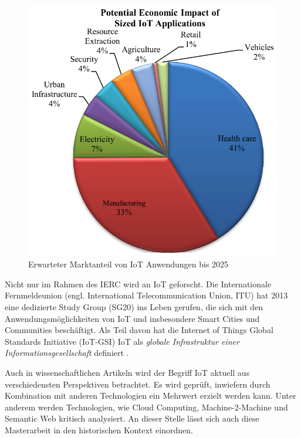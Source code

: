 \begin{figure}[t]
	\centering
	\includegraphics[width=\textwidth]{bilder/iot_market_share}
	\caption{Erwarteter Marktanteil von IoT Anwendungen bis 2025 \cite{IotEnablers}}
	\label{fig:market}
\end{figure}



Nicht nur im Rahmen des IERC wird an IoT geforscht. Die Internationale Fernmeldeunion (engl. International Telecommunication Union, ITU) hat 2013 eine dedizierte Study Group (SG20) ins Leben gerufen, die sich mit den Anwendungsmöglichkeiten von IoT und insbesondere Smart Cities und Communities beschäftigt. Als Teil davon hat die Internet of Things Global Standards Initiative (IoT-GSI) IoT als \textit{globale Infrastruktur einer Informationsgesellschaft} definiert \cite{iot:glob_infr}.  

Auch in wissenschaftlichen Artikeln wird der Begriff IoT aktuell aus verschiedensten Perspektiven betrachtet. Es wird geprüft, inwiefern durch Kombination mit anderen Technologien ein Mehrwert erzielt werden kann. Unter anderem werden Technologien, wie Cloud Computing\cite{FiCloud:CloudIot}, Machine-2-Machine\cite{FiCloud:M3Iot} und Semantic Web\cite{SemWebIoT} kritisch analysiert. An dieser Stelle lässt sich auch diese Masterarbeit in den historischen Kontext einordnen. \\

